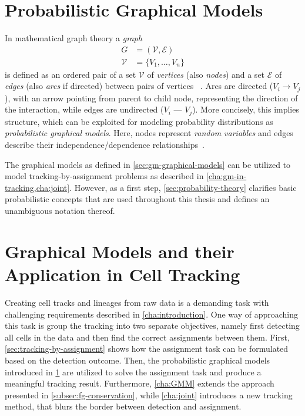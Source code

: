 \chapter{Probabilistic Graphical Models}
\label{cha:probabilistic_graphical_models}

In mathematical graph theory a \emph{graph}
\begin{align}
    G &= (\mathcal{V},\mathcal{E}) \\
    \mathcal{V} &= \{V_1,\hdots ,V_n\}
\end{align}
is defined as an ordered pair of a set $\mathcal{V}$ of \emph{vertices} (also \emph{nodes}) and a
set $\mathcal{E}$ of \emph{edges} (also \emph{arcs} if directed) between pairs of vertices
~\citep[34]{koller_09_probabilistic}. Arcs are directed ($V_i\to V_j$), with an arrow pointing from
parent to child node, representing the direction of the interaction, while edges are undirected
($V_i \textbf{ --- } V_j$). More concisely, this implies structure, which can be exploited for
modeling probability distributions as \emph{probabilistic graphical models}. Here, nodes represent
\emph{random variables} and edges describe their independence/dependence
relationships~\citep[57]{barber_12_bayesian}.

The graphical models as defined in \cref{sec:gm-graphical-models} can be utilized to model
tracking-by-assignment problems as described in \cref{cha:gm-in-tracking,cha:joint}. However, as a
first step, \cref{sec:probability-theory} clarifies basic probabilistic concepts that are used
throughout this thesis and defines an unambiguous notation thereof.




\chapter{Graphical Models and their Application in Cell Tracking}
\label{cha:gm-in-tracking}
Creating cell tracks and lineages from raw data is a demanding task with challenging requirements
described in \cref{cha:introduction}. One way of approaching this task is group the tracking into
two separate objectives, namely first detecting all cells in the data and then find the correct
assignments between them. First, \cref{sec:tracking-by-assignment} shows how the assignment task can
be formulated based on the detection outcome. Then, the probabilistic graphical models introduced in
\cref{cha:probabilistic_graphical_models} are utilized to solve the assignment task and produce a
meaningful tracking result. Furthermore, \cref{cha:GMM} extends the approach presented in
\cref{subsec:fg-conservation}, while \cref{cha:joint} introduces a new tracking method, that blurs
the border between detection and assignment.

\label{cha:graphical_models_and_tracking}



